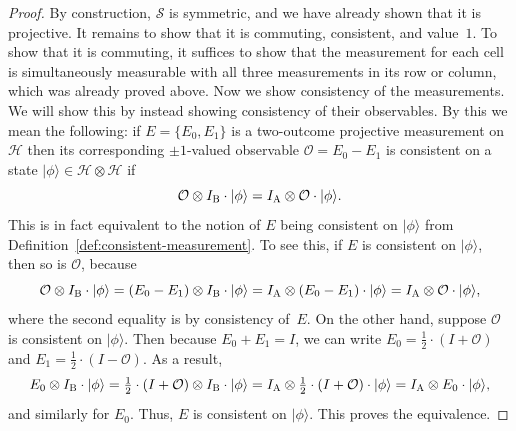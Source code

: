 \documentclass[11pt]{article}
\theoremstyle{definition}
\newcommand{\ket}[1]{|#1\rangle}
\newcommand{\strategy}{\mathscr{S}}
\newcommand{\labelstyle}[1]{\ensuremath{\textsc{#1}}\xspace}
\newcommand{\alice}{\labelstyle{A}}
\newcommand{\bob}{\labelstyle{B}}
\renewcommand{\cal}[1]{\mathcal{#1}}
\begin{document}
\begin{proof}
  By construction, $\strategy$ is symmetric, and we have already shown that it
  is projective.
  It remains to show that it is commuting, consistent, and value~$1$.
  To show that it is commuting, it suffices to show that the measurement for
  each cell is simultaneously measurable with all three measurements in its row
  or column, which was already proved above.
  Now we show consistency of the measurements.
  We will show this by instead showing consistency of their observables.
  By this we mean the following: if $E = \{E_0, E_1\}$ is a two-outcome projective measurement on $\cal{H}$
  then its corresponding $\pm 1$-valued observable $\cal{O} = E_0 - E_1$
  is consistent on a state $\ket{\phi} \in \cal{H} \otimes \cal{H}$ if
  \begin{equation*}
  \cal{O}\otimes I_{\bob} \cdot \ket{\phi} = I_{\alice} \otimes \cal{O} \cdot \ket{\phi}.
  \end{equation*}
  This is in fact equivalent to the notion of $E$ being consistent on $\ket{\phi}$ from Definition~\ref{def:consistent-measurement}.
  To see this, if $E$ is consistent on $\ket{\phi}$, then so is $\cal{O}$, because
  \begin{equation*}
  \cal{O}\otimes I_{\bob} \cdot \ket{\phi}
  = (E_0 - E_1) \otimes I_{\bob} \cdot \ket{\phi}
  = I_{\alice} \otimes (E_0 - E_1) \cdot \ket{\phi}
  = I_{\alice} \otimes \cal{O} \cdot \ket{\phi},
  \end{equation*}
  where the second equality is by consistency of~$E$.
  On the other hand, suppose $\cal{O}$ is consistent on $\ket{\phi}$.
  Then because $E_0 + E_1 = I$, we can write $E_0 = \tfrac{1}{2} \cdot (I + \cal{O})$ and $E_1 = \tfrac{1}{2} \cdot (I - \cal{O})$.
  As a result,
  \begin{equation*}
  E_0 \otimes I_{\bob} \cdot \ket{\phi}
  = \tfrac{1}{2} \cdot (I + \cal{O}) \otimes I_{\bob} \cdot \ket{\phi}
  = I_{\alice} \otimes \tfrac{1}{2} \cdot (I + \cal{O}) \cdot \ket{\phi}
  = I_{\alice} \otimes E_0 \cdot \ket{\phi},
  \end{equation*}
  and similarly for $E_0$. Thus, $E$ is consistent on $\ket{\phi}$.
  This proves the equivalence.
  

\end{proof}
\end{document}
